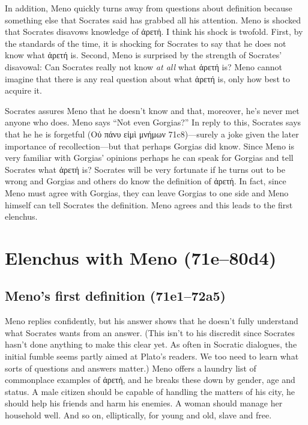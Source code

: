 \documentclass[12pt,letterpaper]{article}
\begin{document}
In addition, Meno quickly turns away from questions about definition because something else that Socrates said has grabbed all his attention. Meno is shocked that Socrates disavows knowledge of \textgreek{ἀρετή}. I think his shock is twofold. First, by the standards of the time, it is shocking for Socrates to say that he does not know what \textgreek{ἀρετή} is. Second, Meno is surprised by the strength of Socrates' disavowal: Can Socrates really not know \textit{at all} what \textgreek{ἀρετή} is? Meno cannot imagine that there is any real question about what \textgreek{ἀρετή} is, only how best to acquire it.

Socrates assures Meno that he doesn't know and that, moreover, he's never met anyone who does. Meno says ``Not even Gorgias?'' In reply to this, Socrates says that he he is forgetful (\textgreek{Οὐ πάνυ εἰμὶ μνήμων} 71c8)---surely a joke given the later importance of recollection—but that perhaps Gorgias did know. Since Meno is very familiar with Gorgias' opinions perhaps he can speak for Gorgias and tell Socrates what \textgreek{ἀρετή} is? Socrates will be very fortunate if he turns out to be wrong and Gorgias and others do know the definition of \textgreek{ἀρετή}. In fact, since Meno must agree with Gorgias, they can leave Gorgias to one side and Meno himself can tell Socrates the definition. Meno agrees and this leads to the first elenchus.

\section*{Elenchus with Meno (71e--80d4)}

\subsection*{Meno's first definition (71e1--72a5)}

Meno replies confidently, but his answer shows that he doesn't fully understand what Socrates wants from an answer. (This isn't to his discredit since Socrates hasn't done anything to make this clear yet. As often in Socratic dialogues, the initial fumble seems partly aimed at Plato's readers. We too need to learn what sorts of questions and answers matter.) Meno offers a laundry list of commonplace examples of \textgreek{ἀρετή}, and he breaks these down by gender, age and status. A male citizen should be capable of handling the matters of his city, he should help his friends and harm his enemies. A woman should manage her household well. And so on, elliptically, for young and old, slave and free.
\end{document}
